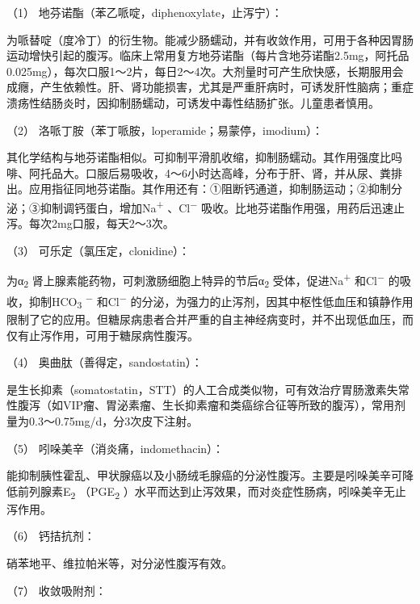 \hypertarget{text00030.htmlux5cux23CHP1-12-3-2-6-1}{}
（1） 地芬诺酯（苯乙哌啶，diphenoxylate，止泻宁）：

为哌替啶（度冷丁）的衍生物。能减少肠蠕动，并有收敛作用，可用于各种因胃肠运动增快引起的腹泻。临床上常用复方地芬诺酯（每片含地芬诺酯2.5mg，阿托品0.025mg），每次口服1～2片，每日2～4次。大剂量时可产生欣快感，长期服用会成癮，产生依赖性。肝、肾功能损害，尤其是严重肝病时，可诱发肝性脑病；重症溃疡性结肠炎时，因抑制肠蠕动，可诱发中毒性结肠扩张。儿童患者慎用。

\hypertarget{text00030.htmlux5cux23CHP1-12-3-2-6-2}{}
（2） 洛哌丁胺（苯丁哌胺，loperamide；易蒙停，imodium）：

其化学结构与地芬诺酯相似。可抑制平滑肌收缩，抑制肠蠕动。其作用强度比吗啡、阿托品大。口服后易吸收，4～6小时达高峰，分布于肝、肾，并从尿、粪排出。应用指征同地芬诺酯。其作用还有：①阻断钙通道，抑制肠运动；②抑制分泌；③抑制调钙蛋白，增加Na\textsuperscript{+}
、Cl\textsuperscript{−}
吸收。比地芬诺酯作用强，用药后迅速止泻。每次2mg口服，每天2～3次。

\hypertarget{text00030.htmlux5cux23CHP1-12-3-2-6-3}{}
（3） 可乐定（氯压定，clonidine）：

为α\textsubscript{2}
肾上腺素能药物，可刺激肠细胞上特异的节后α\textsubscript{2}
受体，促进Na\textsuperscript{+} 和Cl\textsuperscript{−}
的吸收，抑制HCO\textsubscript{3} \textsuperscript{−}
和Cl\textsuperscript{−}
的分泌，为强力的止泻剂，因其中枢性低血压和镇静作用限制了它的应用。但糖尿病患者合并严重的自主神经病变时，并不出现低血压，而仅有止泻作用，可用于糖尿病性腹泻。

\hypertarget{text00030.htmlux5cux23CHP1-12-3-2-6-4}{}
（4） 奥曲肽（善得定，sandostatin）：

是生长抑素（somatostatin，STT）的人工合成类似物，可有效治疗胃肠激素失常性腹泻（如VIP瘤、胃泌素瘤、生长抑素瘤和类癌综合征等所致的腹泻），常用剂量为0.3～0.75mg/d，分3次皮下注射。

\hypertarget{text00030.htmlux5cux23CHP1-12-3-2-6-5}{}
（5） 吲哚美辛（消炎痛，indomethacin）：

能抑制胰性霍乱、甲状腺癌以及小肠绒毛腺癌的分泌性腹泻。主要是吲哚美辛可降低前列腺素E\textsubscript{2}
（PGE\textsubscript{2}
）水平而达到止泻效果，而对炎症性肠病，吲哚美辛无止泻作用。

\hypertarget{text00030.htmlux5cux23CHP1-12-3-2-6-6}{}
（6） 钙拮抗剂：

硝苯地平、维拉帕米等，对分泌性腹泻有效。

\hypertarget{text00030.htmlux5cux23CHP1-12-3-2-6-7}{}
（7） 收敛吸附剂：


